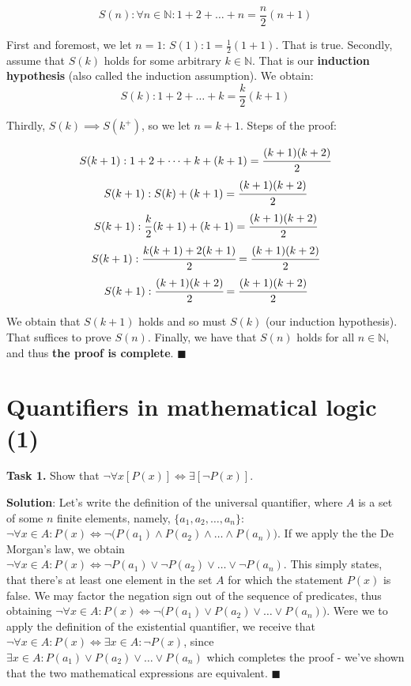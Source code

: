 \documentclass[10pt,a4paper]{article}
\begin{document}
$$S(n): \forall n \in \mathbb{N}: 1 + 2 + \dots + n = \frac{n}{2} (n + 1)$$

First and foremost, we let $n=1$: $S(1): 1 = \frac{1}{2} (1 + 1)$. That is true. \linebreak  %
Secondly, assume that $S(k)$ holds for some arbitrary $k \in \mathbb{N}$.  %
That is our \textbf{induction hypothesis} (also called the induction assumption). We obtain:
$$S(k): 1 + 2 + \dots + k = \frac{k}{2} (k + 1)$$

Thirdly, $S(k) \implies S(k^{+})$, so we let $n=k+1$. Steps of the proof:  %

$$S(k + 1): 1 + 2 + \dots + k + (k + 1) = \cfrac{(k+1)(k+2)}{2}$$  %
$$S(k + 1): S(k) + (k + 1) = \cfrac{(k+1)(k+2)}{2}$$
$$S(k + 1): \frac{k}{2} (k + 1) + (k + 1) = \cfrac{(k+1)(k+2)}{2}$$
$$S(k + 1): \cfrac{k(k+1) + 2(k+1)}{2} = \cfrac{(k+1)(k+2)}{2}$$
$$S(k + 1): \cfrac{(k+1)(k+2)}{2} = \cfrac{(k+1)(k+2)}{2}$$

We obtain that $S(k+1)$ holds and so must $S(k)$ (our induction hypothesis). That suffices to prove $S(n)$.
Finally, we have that $S(n)$ holds for all $n \in \mathbb{N}$, and thus \textbf{the proof is complete}. $\blacksquare$ %


\section*{Quantifiers in mathematical logic (1)} 

\textbf{Task 1.} Show that $\neg \forall x [P(x)] \iff \exists [\neg P(x)]$.

\textbf{Solution}: Let's write the definition of the universal quantifier, where $A$ is a set of some $n$ finite elements,
namely, $\{a_{1}, a_{2}, \dots, a_{n}\}$: $\neg \forall x \in A: P(x) \iff \neg \big( P(a_{1}) \land P(a_{2}) \land \dots \land P(a_{n}) \big)$.
If we apply the the De Morgan's law, we obtain $\neg \forall x \in A: P(x) \iff \neg P(a_{1}) \lor \neg P(a_{2}) \lor \dots \lor \neg P(a_{n})$.
This simply states, that there's at least one element in the set $A$ for which the statement $P(x)$ is false. 
We may factor the negation sign out of the sequence of predicates, thus obtaining $\neg \forall x \in A: P(x) \iff \neg \big( P(a_{1}) \lor P(a_{2}) \lor \dots \lor P(a_{n}) \big)$. 
Were we to apply the definition of the existential quantifier, we receive that $\neg \forall x \in A: P(x) \iff \exists x \in A: \neg P(x)$,
since $\exists x \in A: P(a_{1}) \lor P(a_{2}) \lor \dots \lor P(a_{n})$ which completes the proof - we've shown that the two mathematical expressions are equivalent. $\blacksquare$
\end{document}
